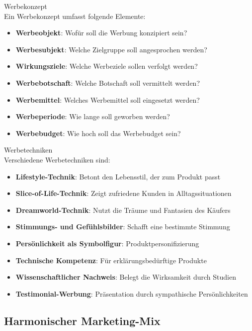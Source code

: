 \begin{definition}{Werbekonzept}\\
Ein Werbekonzept umfasst folgende Elemente:
\begin{itemize}
    \item \textbf{Werbeobjekt}: Wofür soll die Werbung konzipiert sein?
    \item \textbf{Werbesubjekt}: Welche Zielgruppe soll angesprochen werden?
    \item \textbf{Wirkungsziele}: Welche Werbeziele sollen verfolgt werden?
    \item \textbf{Werbebotschaft}: Welche Botschaft soll vermittelt werden?
    \item \textbf{Werbemittel}: Welches Werbemittel soll eingesetzt werden?
    \item \textbf{Werbeperiode}: Wie lange soll geworben werden?
    \item \textbf{Werbebudget}: Wie hoch soll das Werbebudget sein?
\end{itemize}
\end{definition}

\begin{definition}{Werbetechniken}\\
Verschiedene Werbetechniken sind:
\begin{itemize}
    \item \textbf{Lifestyle-Technik}: Betont den Lebensstil, der zum Produkt passt
    \item \textbf{Slice-of-Life-Technik}: Zeigt zufriedene Kunden in Alltagssituationen
    \item \textbf{Dreamworld-Technik}: Nutzt die Träume und Fantasien des Käufers
    \item \textbf{Stimmungs- und Gefühlsbilder}: Schafft eine bestimmte Stimmung
    \item \textbf{Persönlichkeit als Symbolfigur}: Produktpersonifizierung
    \item \textbf{Technische Kompetenz}: Für erklärungsbedürftige Produkte
    \item \textbf{Wissenschaftlicher Nachweis}: Belegt die Wirksamkeit durch Studien
    \item \textbf{Testimonial-Werbung}: Präsentation durch sympathische Persönlichkeiten
\end{itemize}
\end{definition}

\subsection{Harmonischer Marketing-Mix}


